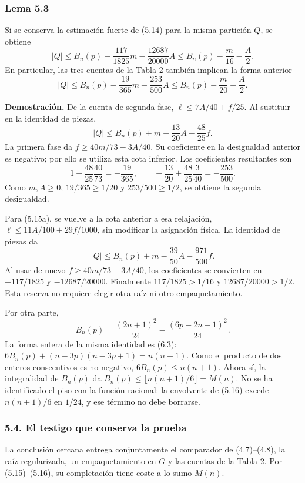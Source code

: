 \documentclass[spanish,11pt,a4paper]{article}
\begin{document}
\subsubsection{Lema 5.3}\label{lema-5.3}

Si se conserva la estimación fuerte de (5.14) para la misma partición \(Q\), se obtiene \[
|Q|\le B_n(p)-\frac{117}{1825}m-\frac{12687}{20000}A
\le B_n(p)-\frac m{16}-\frac A2.
\tag{5.15a}
\] En particular, las tres cuentas de la Tabla 2 también implican la forma anterior \[
|Q|\le B_n(p)-\frac{19}{365}m-\frac{253}{500}A
\le B_n(p)-\frac m{20}-\frac A2.
\tag{5.15}
\]

\textbf{Demostración.} De la cuenta de segunda fase, \(\ell\le7A/40+f/25\). Al sustituir en la identidad de piezas, \[
|Q|\le B_n(p)+m-\frac{13}{20}A-\frac{48}{25}f.
\] La primera fase da \(f\ge40m/73-3A/40\). Su coeficiente en la desigualdad anterior es negativo; por ello se utiliza esta cota inferior. Los coeficientes resultantes son \[
1-\frac{48}{25}\frac{40}{73}=-\frac{19}{365},\qquad
-\frac{13}{20}+\frac{48}{25}\frac3{40}=-\frac{253}{500}.
\] Como \(m,A\ge0\), \(19/365\ge1/20\) y \(253/500\ge1/2\), se obtiene la segunda desigualdad.

Para (5.15a), se vuelve a la cota anterior a esa relajación, \(\ell\le11A/100+29f/1000\), sin modificar la asignación física. La identidad de piezas da \[
|Q|\le B_n(p)+m-\frac{39}{50}A-\frac{971}{500}f.
\] Al usar de nuevo \(f\ge40m/73-3A/40\), los coeficientes se convierten en \(-117/1825\) y \(-12687/20000\). Finalmente \(117/1825>1/16\) y \(12687/20000>1/2\). Esta reserva no requiere elegir otra raíz ni otro empaquetamiento.

Por otra parte, \[
B_n(p)=\frac{(2n+1)^2}{24}-\frac{(6p-2n-1)^2}{24}.
\tag{5.16}
\] La forma entera de la misma identidad es (6.3): \(6B_n(p)+(n-3p)(n-3p+1)=n(n+1)\). Como el producto de dos enteros consecutivos es no negativo, \(6B_n(p)\le n(n+1)\). Ahora sí, la integralidad de \(B_n(p)\) da \(B_n(p)\le\lfloor n(n+1)/6\rfloor=M(n)\). No se ha identificado el piso con la función racional: la envolvente de (5.16) excede \(n(n+1)/6\) en \(1/24\), y ese término no debe borrarse.

\subsubsection{5.4. El testigo que conserva la prueba}\label{el-testigo-que-conserva-la-prueba}

La conclusión cercana entrega conjuntamente el comparador de (4.7)--(4.8), la raíz regularizada, un empaquetamiento en \(G\) y las cuentas de la Tabla 2. Por (5.15)--(5.16), su completación tiene coste a lo sumo \(M(n)\).
\end{document}
